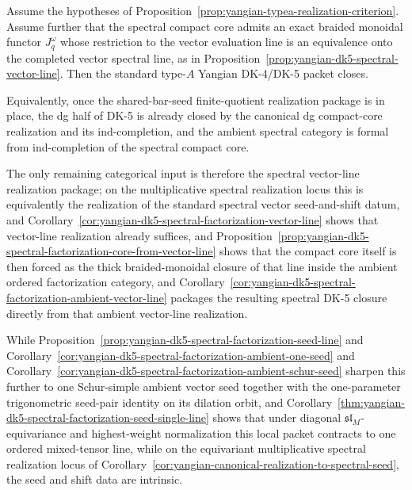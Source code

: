 \begin{corollary}
\label{cor:yangian-typea-realization-plus-dg-packet-orig}
Assume the hypotheses of
Proposition~\ref{prop:yangian-typea-realization-criterion}. Assume
further that the spectral compact core admits an exact braided monoidal
functor \(J_q^\omega\) whose restriction to the vector evaluation line
is an equivalence onto the completed vector spectral line, as in
Proposition~\ref{prop:yangian-dk5-spectral-vector-line}.
Then the standard type-$A$ Yangian DK-4/DK-5 packet closes.

Equivalently, once the shared-bar-seed finite-quotient realization
package is in place, the dg half of DK-5 is already closed by the
canonical dg compact-core realization and its ind-completion, and the
ambient spectral category is formal from ind-completion of the spectral
compact core.

The only remaining categorical input is therefore the
spectral vector-line realization package; on the multiplicative
spectral realization locus this is equivalently the realization of the
standard spectral vector seed-and-shift datum, and
Corollary~\ref{cor:yangian-dk5-spectral-factorization-vector-line}
shows that vector-line realization already suffices, and
Proposition~\ref{prop:yangian-dk5-spectral-factorization-core-from-vector-line}
shows that the compact core itself is then forced as the thick
braided-monoidal closure of that line inside the ambient ordered
factorization category, and
Corollary~\ref{cor:yangian-dk5-spectral-factorization-ambient-vector-line}
packages the resulting spectral DK-5 closure directly from that ambient
vector-line realization.

While
Proposition~\ref{prop:yangian-dk5-spectral-factorization-seed-line}
and
Corollary~\ref{cor:yangian-dk5-spectral-factorization-ambient-one-seed}
and
Corollary~\ref{cor:yangian-dk5-spectral-factorization-ambient-schur-seed}
sharpen this further to one Schur-simple ambient vector seed together
with the one-parameter trigonometric seed-pair identity on its
dilation orbit, and
Corollary~\ref{thm:yangian-dk5-spectral-factorization-seed-single-line}
shows that under diagonal \(\mathfrak{sl}_M\)-equivariance and
highest-weight normalization this local packet contracts to one ordered
mixed-tensor line, while on the
equivariant multiplicative spectral realization locus of
Corollary~\ref{cor:yangian-canonical-realization-to-spectral-seed},
the seed and shift data are intrinsic.
\end{corollary}

